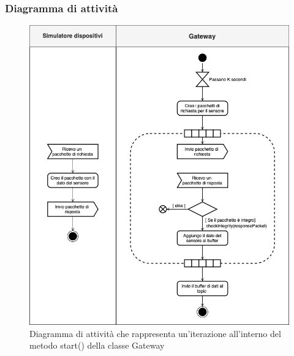 	\subsubsection{Diagramma di attività}%
		\begin{figure}[H]
			\centering
			\includegraphics[scale=0.500]{res/images/GATEWAY/gateway.start().png}
			\caption{Diagramma di attività che rappresenta un'iterazione all'interno del metodo start() della classe Gateway}
			\label{Diagramma 4}
		\end{figure}








